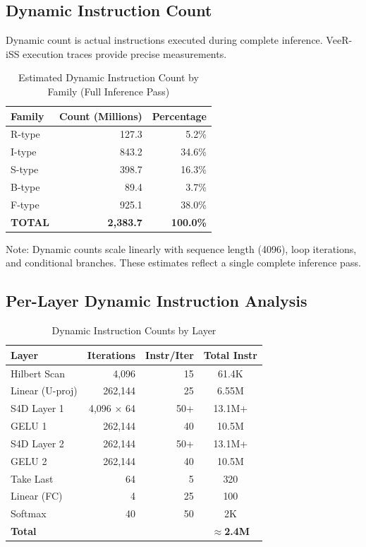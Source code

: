 \documentclass[conference]{IEEEtran}
\begin{document}
\subsection{Dynamic Instruction Count}

Dynamic count is actual instructions executed during complete inference. VeeR-iSS execution traces provide precise measurements.

\begin{table}[h]
\centering
\caption{Estimated Dynamic Instruction Count by Family (Full Inference Pass)}
\begin{tabular}{lrr}
\toprule
\textbf{Family} & \textbf{Count (Millions)} & \textbf{Percentage} \\
\midrule
R-type & 127.3 & 5.2\% \\
I-type & 843.2 & 34.6\% \\
S-type & 398.7 & 16.3\% \\
B-type & 89.4 & 3.7\% \\
F-type & 925.1 & 38.0\% \\
\midrule
\textbf{TOTAL} & \textbf{2,383.7} & \textbf{100.0\%} \\
\bottomrule
\end{tabular}
\end{table}

Note: Dynamic counts scale linearly with sequence length (4096), loop iterations, and conditional branches. These estimates reflect a single complete inference pass.

\subsection{Per-Layer Dynamic Instruction Analysis}

\begin{table}[h]
\centering
\caption{Dynamic Instruction Counts by Layer}
\begin{tabular}{lrrc}
\toprule
\textbf{Layer} & \textbf{Iterations} & \textbf{Instr/Iter} & \textbf{Total Instr} \\
\midrule
Hilbert Scan & 4,096 & 15 & 61.4K \\
Linear (U-proj) & 262,144 & 25 & 6.55M \\
S4D Layer 1 & 4,096 × 64 & 50+ & 13.1M+ \\
GELU 1 & 262,144 & 40 & 10.5M \\
S4D Layer 2 & 262,144 & 50+ & 13.1M+ \\
GELU 2 & 262,144 & 40 & 10.5M \\
Take Last & 64 & 5 & 320 \\
Linear (FC) & 4 & 25 & 100 \\
Softmax & 40 & 50 & 2K \\
\midrule
\textbf{Total} & & & \textbf{$\approx$2.4M} \\
\bottomrule
\end{tabular}
\end{table}
\end{document}

